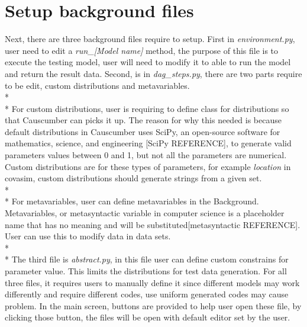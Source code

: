 \section{Setup background files}
Next, there are three background files require to setup. First in \textsl{environment.py}, user need to edit a \textsl{run\_[Model name]} method, the purpose of this file is to execute the testing model, user will need to modify it to able to run the model and return the result data. Second, is in \textsl{dag\_steps.py}, there are two parts require to be edit, custom distributions and metavariables. \\*\\*
For custom distributions, user is requiring to define class for distributions so that Causcumber can picks it up. The reason for why this needed is because default distributions in Causcumber uses SciPy, an open-source software for mathematics, science, and engineering [SciPy REFERENCE], to generate valid parameters values between 0 and 1, but not all the parameters are numerical. Custom distributions are for these types of parameters, for example \textsl{location} in covasim, custom distributions should generate strings from a given set.\\*\\*
For metavariables, user can define metavariables in the Background. Metavariables, or metasyntactic variable in computer science is a placeholder name that has no meaning and will be substituted[metasyntactic REFERENCE]. User can use this to modify data in data sets.\\*\\*
The third file is \textsl{abstract.py}, in this file user can define custom constrains for parameter value. This limits the distributions for test data generation. For all three files, it requires users to manually define it since different models may work differently and require different codes, use uniform generated codes may cause problem. In the main screen, buttons are provided to help user open these file, by clicking those button, the files will be open with default editor set by the user.

